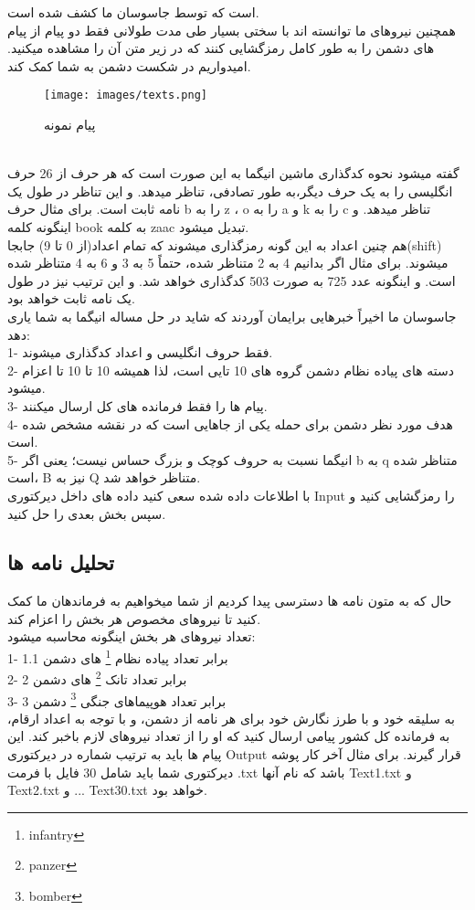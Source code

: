     است که توسط جاسوسان ما کشف شده است.
    \\
    \newpage
    همچنین نیروهای ما توانسته اند با سختی بسیار طی مدت طولانی فقط دو پیام از پیام های دشمن را به طور کامل رمزگشایی کنند که در زیر متن آن را مشاهده میکنید. امیدواریم در شکست دشمن به شما کمک کند.
    \\
     \begin{figure}[h!]
        \centering
        \texttt{[image: images/texts.png]}
        \caption{پیام نمونه}
        \label{fig:merge}
    \end{figure}\\
    گفته میشود نحوه کدگذاری ماشین انیگما به این صورت است که هر حرف از 26 حرف انگلیسی را به یک حرف دیگر،به طور تصادفی، تناظر میدهد. و این تناظر در طول یک نامه ثابت است.
    برای مثال حرف b را به z
    ،
    o را به a
    و
    k را به c تناظر میدهد.
    و اینگونه کلمه book به کلمه zaac تبدیل میشود.
    \\
    هم چنین اعداد به این گونه رمزگذاری میشوند که تمام اعداد(از 0 تا 9) جابجا(shift) میشوند.
    برای مثال اگر بدانیم 4 به 2 متناظر شده، حتماً 5 به 3 و 6 به 4 متناظر شده است.
    و اینگونه عدد 725 به صورت 503 کدگذاری خواهد شد.
    و این ترتیب نیز در طول یک نامه ثابت خواهد بود.
    \\
    جاسوسان ما اخیراً خبرهایی برایمان آوردند که شاید در حل مساله انیگما به شما یاری دهد:
    \\
    1- فقط حروف انگلیسی و اعداد کدگذاری میشوند.
    \\
    2- دسته های پیاده نظام دشمن گروه های 10 تایی است، لذا همیشه 10 تا 10 تا اعزام میشود.
    \\
    3- پیام ها را فقط فرمانده های کل ارسال میکنند.
    \\
    4- هدف مورد نظر دشمن برای حمله یکی از جاهایی است که در نقشه مشخص شده است.
    \\
    5- انیگما نسبت به حروف کوچک و بزرگ حساس نیست؛ یعنی اگر b به q متناظر شده است، B نیز به Q متناظر خواهد شد.
    \\
    با اطلاعات داده شده سعی کنید داده های داخل دیرکتوری Input را رمزگشایی کنید و سپس بخش بعدی را حل کنید.
    
    \subsection{تحلیل نامه ها}
    حال که به متون نامه ها دسترسی پیدا کردیم از شما میخواهیم به فرماندهان ما کمک کنید تا نیروهای مخصوص هر بخش را اعزام کند.
    \\
    تعداد نیروهای هر بخش اینگونه محاسبه میشود:
    \\
    1- 1.1 برابر تعداد پیاده نظام
    \footnote{infantry}
    های دشمن
    \\
    2- 2 برابر تعداد تانک
    \footnote{panzer}
    های دشمن
    \\
    3- 3 برابر تعداد هوپیماهای جنگی
    \footnote{bomber}
    دشمن
    \\
    به سلیقه خود و با طرز نگارش خود برای هر نامه از دشمن، و با توجه به اعداد ارقام، به فرمانده کل کشور پیامی ارسال کنید که او را از تعداد نیروهای لازم باخبر کند.
    این پیام ها باید به ترتیب شماره در دیرکتوری Output قرار گیرند.
    برای مثال آخر کار پوشه دیرکتوری شما باید شامل 30 فایل با فرمت .txt باشد
    که نام آنها Text1.txt 
    و
    Text2.txt
    و ...
    Text30.txt
    خواهد بود.
